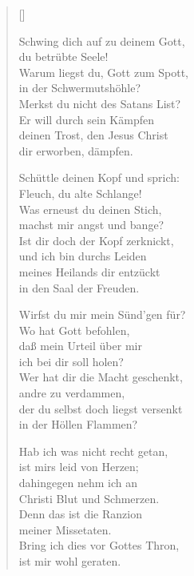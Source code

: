 \begin{multicols}{2}
\settowidth{\versewidth}{Schwing dich auf zu deinem Gott,}
\begin{verse}[\versewidth]

 Schwing dich auf zu deinem Gott,\\
du betrübte Seele!\\
Warum liegst du, Gott zum Spott,\\
in der Schwermutshöhle?\\
Merkst du nicht des Satans List?\\
Er will durch sein Kämpfen\\
deinen Trost, den Jesus Christ\\
dir erworben, dämpfen.

 Schüttle deinen Kopf und sprich:\\
Fleuch, du alte Schlange!\\
Was erneust du deinen Stich,\\
machst mir angst und bange?\\
Ist dir doch der Kopf zerknickt,\\
und ich bin durchs Leiden\\
meines Heilands dir entzückt\\
in den Saal der Freuden.

 Wirfst du mir mein Sünd'gen für?\\
Wo hat Gott befohlen,\\
daß mein Urteil über mir\\
ich bei dir soll holen?\\
Wer hat dir die Macht geschenkt,\\
andre zu verdammen,\\
der du selbst doch liegst versenkt\\
in der Höllen Flammen?

 Hab ich was nicht recht getan,\\
ist mirs leid von Herzen;\\
dahingegen nehm ich an\\
Christi Blut und Schmerzen.\\
Denn das ist die Ranzion\\
meiner Missetaten.\\
Bring ich dies vor Gottes Thron,\\
ist mir wohl geraten.


\end{verse}
\end{multicols}
